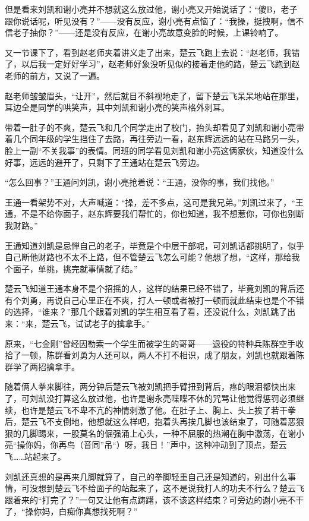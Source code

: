 但是看来刘凯和谢小亮并不想就这么放过他，谢小亮又开始说话了：“傻B，老子跟你说话呢，听见没有？”——没有反应，谢小亮有点恼了：“我操，挺拽啊，信不信老子抽你？”——还是没有反应，在谢小亮故意变脸的时候，上课铃响了。

又一节课下了，看到赵老师夹着讲义走了出来，楚云飞跑上去说：“赵老师，我错了，以后我一定好好学习”，赵老师好象没听见似的接着走他的路，楚云飞跑到赵老师的前方，又说了一遍。

赵老师皱皱眉头，“让开”，然后就目不斜视地走了，留下楚云飞呆呆地站在那里，耳边全是同学的哄笑声，其中刘凯和谢小亮的笑声格外刺耳。

带着一肚子的不爽，楚云飞和几个同学走出了校门，抬头却看见了刘凯和谢小亮带着几个同年级的学生挡住了去路，再往旁边一看，赵东辉远远的站在马路另一头，脸上一副“不关我事”的表情。同班的同学看见刘凯和谢小亮这俩家伙，知道没什么好事，远远的避开了，只剩下了王通站在楚云飞旁边。

“怎么回事？”王通问刘凯，谢小亮抢着说：“王通，没你的事，我们找他。”

王通一看架势不对，大声喊道：“操，差不多点，这可是我兄弟。”刘凯过来了，“王通，不是不给你面子，赵东辉要我们帮忙的，你也知道，我不想惹你，可你也别断我财路。”

王通知道刘凯是忌惮自己的老子，毕竟是个中层干部呢，可刘凯话都挑明了，似乎自己断他财路也不太不上路，但不管楚云飞怎么可能？他想了想，“这样，那给我个面子，单挑，挑完就事情就了结。”

楚云飞知道王通本身不是个招摇的人，这样的结果已经不错了，毕竟刘凯的背后还有个刘勇，再说自己心里正在不爽，打人一顿或者被打一顿而就此结束也是个不错的选择，“谁来？”那几个跟着刘凯的学生相互看了看，还没说什么，刘凯跳了出来：“来，楚云飞，试试老子的擒拿手。”

原来，“七金刚”曾经因勒索一个学生而被学生的哥哥——退役的特种兵陈群空手收拾了一顿，陈群看刘勇为人还可以，两人不打不相识，成了朋友，刘凯也就跟着陈群学了两招擒拿手。

随着俩人拳来脚往，两分钟后楚云飞被刘凯把手臂扭到背后，疼的眼泪都快出来了，可刘凯没打算这么放过他，也许是谢永亮喋喋不休的咒骂让他觉得惩罚必须继续，也许是楚云飞不卑不亢的神情刺激了他。在肚子上、胸上、头上挨了若干拳后，楚云飞不支倒地，他想就这么样吧，抱着头再挨几脚也该结束了，可随着恶狠狠的几脚踢来，一股莫名的倔强涌上心头，一种不屈服的热潮在胸中激荡，在谢小亮“操你妈，你再鸟（音同”吊“）呀，我日！”声中，这种冲动到了顶点，楚云飞……站起来了。

刘凯还真想的是再来几脚就算了，自己的拳脚轻重自己还是知道的，别出什么事情，可没想到楚云飞不给面子的站起来了，这不是说我打人的功夫不行么？楚云飞跟着来的“打完了？”一句又让他有点踌躇，该不该这样结束？可旁边的谢小亮不干了，“操你妈，白痴你真想找死啊？”

